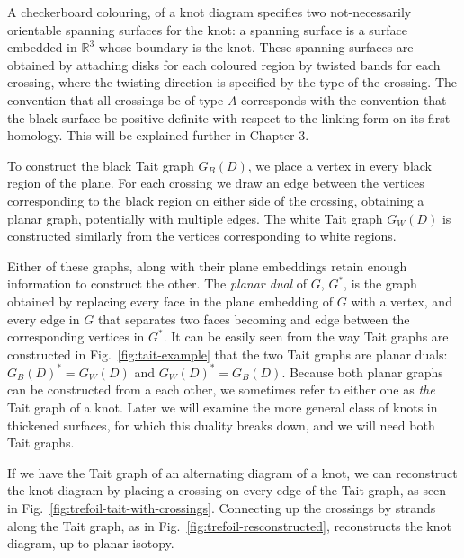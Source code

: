 \documentclass[12pt]{report}
\newcommand{\R}{\mathbb{R}}
\theoremstyle{upright}
\begin{document}
A checkerboard colouring, of a knot diagram specifies two not-necessarily orientable spanning surfaces for the knot: a spanning surface is a surface embedded in $\R^{3}$ whose boundary is the knot. These spanning surfaces are obtained by attaching disks for each coloured region by twisted bands for each crossing, where the twisting direction is specified by the type of the crossing. The convention that all crossings be of type $A$ corresponds with the convention that the black surface be positive definite with respect to the linking form on its first homology. This will be explained further in Chapter 3.

To construct the black Tait graph $G_{B}(D)$, we place a vertex in every black region of the plane. For each crossing we draw an edge between the vertices corresponding to the black region on either side of the crossing, obtaining a planar graph, potentially with multiple edges. The white Tait graph $G_{W}(D)$ is constructed similarly from the vertices corresponding to white regions.

Either of these graphs, along with their plane embeddings retain enough information to construct the other. The \textit{planar dual} of $G$, $G^{*}$, is the graph obtained by replacing every face in the plane embedding of $G$ with a vertex, and every edge in $G$ that separates two faces becoming and edge between the corresponding vertices in $G^{*}$. It can be easily seen from the way Tait graphs are constructed in Fig.~\ref{fig:tait-example} that the two Tait graphs are planar duals: $G_{B}(D)^{*} = G_{W}(D)$ and $G_{W}(D)^{*} = G_{B}(D)$. Because both planar graphs can be constructed from a each other, we sometimes refer to either one as \textit{the} Tait graph of a knot. Later we will examine the more general class of knots in thickened surfaces, for which this duality breaks down, and we will need both Tait graphs.

If we have the Tait graph of an alternating diagram of a knot, we can reconstruct the knot diagram by placing a crossing on every edge of the Tait graph, as seen in Fig.~\ref{fig:trefoil-tait-with-crossings}. Connecting up the crossings by strands along the Tait graph, as in Fig.~\ref{fig:trefoil-resconstructed},	 reconstructs the knot diagram, up to planar isotopy.
\end{document}
